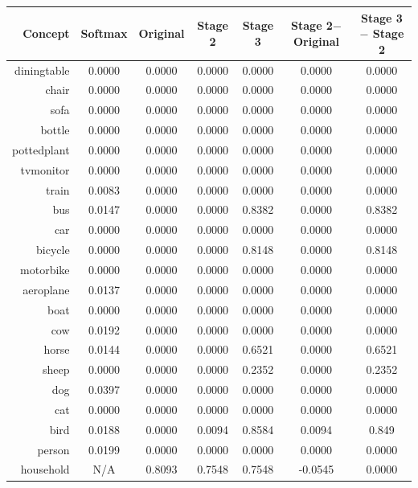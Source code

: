 \documentclass[11pt,a4paper]{article}
\begin{document}
\begin{table}[htbp]
\centering
\begin{tabular}{r|c|c|c|c|c|c}
Concept & Softmax & Original & Stage 2 & Stage 3 & \makecell{Stage 2$-$\\Original} & \makecell{Stage 3$-$\\Stage 2}\\\hline
diningtable   & 0.0000 & 0.0000 & 0.0000 & 0.0000 & 0.0000 & 0.0000\\
chair         & 0.0000 & 0.0000 & 0.0000 & 0.0000 & 0.0000 & 0.0000\\
sofa          & 0.0000 & 0.0000 & 0.0000 & 0.0000 & 0.0000 & 0.0000\\
bottle        & 0.0000 & 0.0000 & 0.0000 & 0.0000 & 0.0000 & 0.0000\\
pottedplant   & 0.0000 & 0.0000 & 0.0000 & 0.0000 & 0.0000 & 0.0000\\
tvmonitor     & 0.0000 & 0.0000 & 0.0000 & 0.0000 & 0.0000 & 0.0000\\
train         & 0.0083 & 0.0000 & 0.0000 & 0.0000 & 0.0000 & 0.0000\\
bus           & 0.0147 & 0.0000 & 0.0000 & 0.8382 & 0.0000 & 0.8382\\
car           & 0.0000 & 0.0000 & 0.0000 & 0.0000 & 0.0000 & 0.0000\\
bicycle       & 0.0000 & 0.0000 & 0.0000 & 0.8148 & 0.0000 & 0.8148\\
motorbike     & 0.0000 & 0.0000 & 0.0000 & 0.0000 & 0.0000 & 0.0000\\
aeroplane     & 0.0137 & 0.0000 & 0.0000 & 0.0000 & 0.0000 & 0.0000\\
boat          & 0.0000 & 0.0000 & 0.0000 & 0.0000 & 0.0000 & 0.0000\\
cow           & 0.0192 & 0.0000 & 0.0000 & 0.0000 & 0.0000 & 0.0000\\
horse         & 0.0144 & 0.0000 & 0.0000 & 0.6521 & 0.0000 & 0.6521\\
sheep         & 0.0000 & 0.0000 & 0.0000 & 0.2352 & 0.0000 & 0.2352\\
dog           & 0.0397 & 0.0000 & 0.0000 & 0.0000 & 0.0000 & 0.0000\\
cat           & 0.0000 & 0.0000 & 0.0000 & 0.0000 & 0.0000 & 0.0000\\
bird          & 0.0188 & 0.0000 & 0.0094 & 0.8584 & 0.0094 & 0.849\\
person        & 0.0199 & 0.0000 & 0.0000 & 0.0000 & 0.0000 & 0.0000\\\hline
household     & N/A    & 0.8093 & 0.7548 & 0.7548 & -0.0545 & 0.0000\\

\end{tabular}
\end{table}
\end{document}
